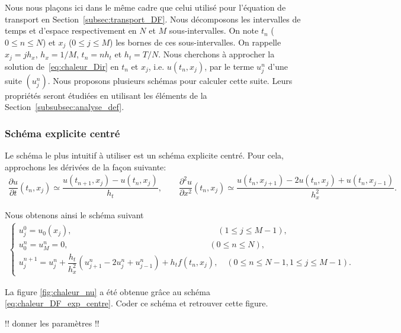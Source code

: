 \documentclass[12pt,a4paper,twoside]{article}
\begin{document}
Nous nous pla\c{c}ons ici dans le m\^eme cadre que celui utilis\'e pour 
l'\'equation de transport en Section~\ref{subsec:transport_DF}.
Nous d\'ecomposons les intervalles de temps et d'espace
respectivement en $N$ et $M$ sous-intervalles.
On note $t_n$ ($0 \leq n \leq N$) et $x_j$ ($0 \leq j \leq M$)
les bornes de ces sous-intervalles.
On rappelle $x_j = j h_x$, $h_x = 1/M$, $t_n = n h_t$ et $h_t = T / N$.
Nous cherchons \`a approcher la solution de~\eqref{eq:chaleur_Dir}
en $t_n$ et $x_j$, i.e. $u(t_n,x_j)$, par le terme $u_j^n$ d'une suite
$(u_j^n)$. 
Nous proposons plusieurs sch\'emas pour calculer cette suite.
Leurs propri\'et\'es seront \'etudi\'ees en utilisant les 
\'el\'ements de la Section~\ref{subsubsec:analyse_def}.

\subsubsection{Sch\'ema explicite centr\'e}

Le sch\'ema le plus intuitif \`a utiliser est un sch\'ema 
explicite centr\'e.
Pour cela, approchons les d\'eriv\'ees de la fa\c{c}on suivante:
\begin{align*}
  \dfrac{\partial u}{\partial t}(t_n,x_j) \simeq \dfrac{u(t_{n+1},x_j) - u(t_n,x_j)}{h_t} ,
  \qquad 
  \dfrac{\partial^2 u}{\partial x^2}(t_n,x_j) 
  \simeq \dfrac{u(t_{n},x_{j+1}) - 2 u(t_n,x_j) + u(t_n,x_{j-1})}{h_x^2} .
\end{align*}


Nous obtenons ainsi le sch\'ema suivant
\begin{align}
  \label{eq:chaleur_DF_exp_centre}
  \left\{
  \begin{array}{l}
    u_j^0
    = u_0(x_j) ,
    \qquad \qquad \qquad \qquad \qquad \qquad \qquad \qquad \;\;\quad
    (1 \leq j \leq M-1) , 
    \\
    u_0^n = u_M^n = 0 ,
    \qquad \qquad \qquad \qquad \qquad \qquad \qquad \qquad \quad
    (0 \leq n \leq N), 
    \\
    u_j^{n+1}
    = u_j^{n} + \dfrac{h_t}{h_x^2} (u_{j+1}^{n} - 2 u_{j}^{n} + u_{j-1}^{n} ) 
    + h_t f(t_n,x_j) ,
    \quad (0 \leq n \leq N-1, 1 \leq j \leq M-1).
  \end{array}
  \right.
\end{align}

\begin{exercise}
  La figure \ref{fig:chaleur_nu} 
  a \'et\'e obtenue gr\^ace au sch\'ema \eqref{eq:chaleur_DF_exp_centre}.
  Coder ce sch\'ema et retrouver cette figure.
  
  !! donner les param\`etres !!
\end{exercise}
\end{document}
